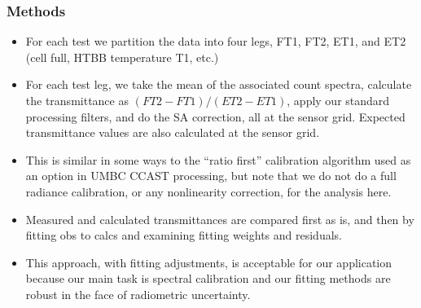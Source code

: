 \documentclass[9pt]{beamer}
\begin{document}
\begin{frame}
\frametitle{Methods}
\begin{itemize}

  \item For each test we partition the data into four legs, FT1,
    FT2, ET1, and ET2 (cell full, HTBB temperature T1, etc.)

  \item For each test leg, we take the mean of the associated count
    spectra, calculate the transmittance as $(FT2 - FT1) / (ET2 -
    ET1)$, apply our standard processing filters, and do the SA
    correction, all at the sensor grid.  Expected transmittance
    values are also calculated at the sensor grid.

  \item This is similar in some ways to the ``ratio first''
    calibration algorithm used as an option in UMBC CCAST
    processing, but note that we do not do a full radiance
    calibration, or any nonlinearity correction, for the analysis
    here.

  \item Measured and calculated transmittances are compared first as
    is, and then by fitting obs to calcs and examining fitting
    weights and residuals.

  \item This approach, with fitting adjustments, is acceptable for
    our application because our main task is spectral calibration
    and our fitting methods are robust in the face of radiometric
    uncertainty.

\end{itemize}
\end{frame}
\end{document}

